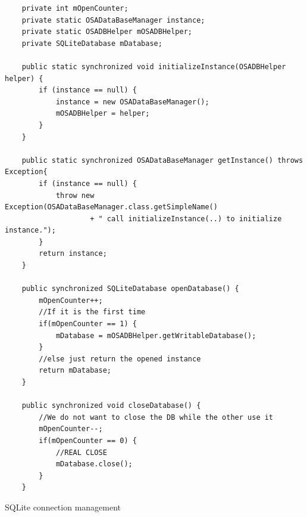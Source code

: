 \begin{code}[ht]
\begin{lstlisting}
    private int mOpenCounter;
	private static OSADataBaseManager instance;
	private static OSADBHelper mOSADBHelper;
	private SQLiteDatabase mDatabase;

	public static synchronized void initializeInstance(OSADBHelper helper) {
	    if (instance == null) {
	        instance = new OSADataBaseManager();
	        mOSADBHelper = helper;
	    }
	}

	public static synchronized OSADataBaseManager getInstance() throws Exception{
	    if (instance == null) {
	        throw new Exception(OSADataBaseManager.class.getSimpleName() 
	                + " call initializeInstance(..) to initialize instance.");
	    }
	    return instance;
	}

	public synchronized SQLiteDatabase openDatabase() {
	    mOpenCounter++;
	    //If it is the first time
	    if(mOpenCounter == 1) {
	        mDatabase = mOSADBHelper.getWritableDatabase();
	    }
	    //else just return the opened instance
	    return mDatabase;
	}

	public synchronized void closeDatabase() {
	    //We do not want to close the DB while the other use it
	    mOpenCounter--;
	    if(mOpenCounter == 0) {
	        //REAL CLOSE
	        mDatabase.close();
	    }
	}
\end{lstlisting}
\caption[SQLite connection management]{SQLite connection management}
\label{listing:SQLiteConnection}
\end{code}
